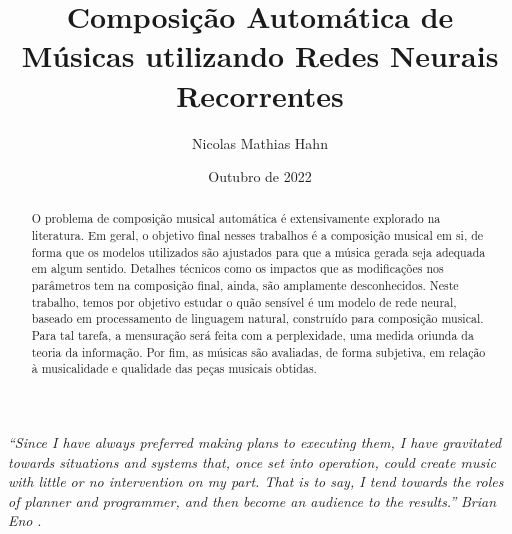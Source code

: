 \documentclass{automatextcc}
\begin{document}
\title{Composição Automática de Músicas utilizando Redes Neurais Recorrentes}
\author{Nicolas Mathias Hahn}



\dept{\DEST}

\date{Outubro de 2022}


\maketitulo

\makefolhaderosto

\makefolhadeaprovacaoA %


\newpage
\vspace*{\fill}
\begin{flushright} %
	\textit{``Since I have always preferred making plans to executing them, I have gravitated towards situations and systems that, once set into operation, could create music with little or no intervention on my part. That is to say, I tend towards the roles of planner and programmer, and then become an audience to the results.''} \newline
	\textit{Brian Eno \citep{alpern1995}}.
\end{flushright}




\begin{abstract}
O problema de composição musical automática é extensivamente  explorado na literatura. Em geral, o objetivo final nesses trabalhos é a composição musical em si, de forma que os modelos utilizados são ajustados para que a música gerada seja adequada em algum sentido. Detalhes técnicos como os impactos que as modificações nos parâmetros tem na composição final, ainda, são amplamente desconhecidos. Neste trabalho, temos por objetivo estudar o quão sensível é um modelo de rede neural, baseado em processamento de linguagem natural, construído para composição musical. Para tal tarefa, a mensuração será feita com a perplexidade, uma medida oriunda da teoria da informação. Por fim, as músicas são avaliadas, de forma subjetiva, em relação à musicalidade e qualidade das peças musicais obtidas.
\end{abstract}
\end{document}
